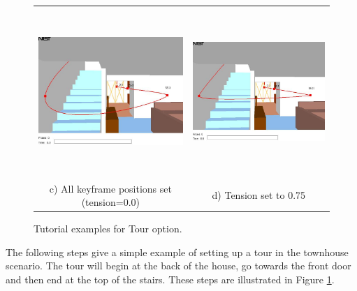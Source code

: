 \documentclass[11pt,twoside]{book}
\newcommand{\figheightA}{2.5in}
\begin{document}
\begin{figure}[\figoptions]
\begin{center}
\begin{tabular}{cc}
\includegraphics[height=\figheightA]{FIGURES/figTOUR_3}&
\includegraphics[height=\figheightA]{FIGURES/figTOUR_4}\\
c) All keyframe positions set (tension=0.0)&d) Tension set to 0.75
\end{tabular}
\end{center}
\caption [Tutorial examples for Tour option.] {Tutorial examples for Tour option.}
\label{figTutorial}%
\end{figure}


The following steps give a simple example of setting up a tour in the
townhouse scenario.  The tour will begin at the back of the house,
go towards the front door and then end at the top of the stairs.
These steps are illustrated in Figure \ref{figTutorial}.
\end{document}
